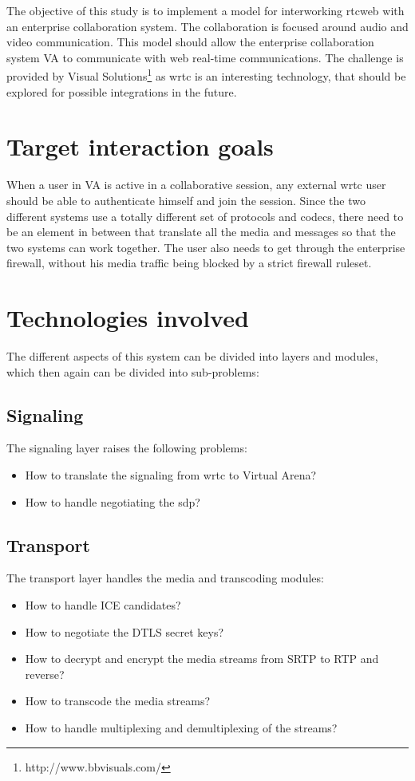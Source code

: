 
The objective of this study is to implement a model for interworking \gls{rtcweb} with an enterprise collaboration system. The collaboration is focused around audio and video communication. This model should allow the enterprise collaboration system VA to communicate with web real-time communications. The challenge is provided by Visual Solutions\footnote{http://www.bbvisuals.com/} as \gls{wrtc} is an interesting technology, that should be explored for possible integrations in the future.

\section{Target interaction goals}
When a user in VA is active in a collaborative session, any external \gls{wrtc} user should be able to authenticate himself and join the session. Since the two different systems use a totally different set of protocols and codecs, there need to be an element in between that translate all the media and messages so that the two systems can work together. The user also needs to get through the enterprise firewall, without his media traffic being blocked by a strict firewall ruleset.

\section{Technologies involved}
The different aspects of this system can be divided into layers and modules, which then again can be divided into sub-problems:

\subsection{Signaling}
The signaling layer raises the following problems:
\begin{itemize}
\item{How to translate the signaling from \gls{wrtc} to Virtual Arena?}
\item{How to handle negotiating the \gls{sdp}?}
\end{itemize}

\subsection{Transport}
The transport layer handles the media and transcoding modules:
\begin{itemize}
\item{How to handle ICE candidates?}
\item{How to negotiate the DTLS secret keys?}
\item{How to decrypt and encrypt the media streams from SRTP to RTP and reverse?}
\item{How to transcode the media streams?}
\item{How to handle multiplexing and demultiplexing of the streams?}
\end{itemize}

